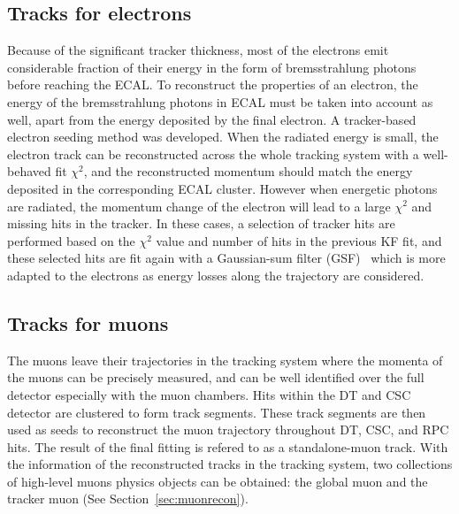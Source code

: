 \subsection{Tracks for electrons}
Because of the significant tracker thickness, most of the electrons emit considerable fraction of their energy in the form of bremsstrahlung photons before reaching the ECAL. To reconstruct the properties of an electron, the energy of the bremsstrahlung photons in ECAL must be taken into account as well, apart from the energy deposited by the final electron. A tracker-based electron seeding method was developed. When the radiated energy is small, the electron track can be reconstructed across the whole tracking system with a well-behaved fit $\chi^2$, and the reconstructed momentum should match the energy deposited in the corresponding ECAL cluster. However when energetic photons are radiated, the momentum change of the electron will lead to a large $\chi^2$ and missing hits in the tracker. In these cases, a selection of tracker hits are performed based on the $\chi^2$ value and number of hits in the previous KF fit, and these selected hits are fit again with a Gaussian-sum filter (GSF)~\cite{ob_electronconst} which is more adapted to the electrons as energy losses along the trajectory are considered. 

\subsection{Tracks for muons}
The muons leave their trajectories in the tracking system where the momenta of the muons can be precisely measured, and can be well identified over the full detector especially with the muon chambers. Hits within the DT and CSC detector are clustered to form track segments. These track segments are then used as seeds to reconstruct the muon trajectory throughout DT, CSC, and RPC hits. The result of the final fitting is refered to as a standalone-muon track. With the information of the reconstructed tracks in the tracking system, two collections of high-level muons physics objects can be obtained: the global muon and the tracker muon (See Section~\ref{sec:muonrecon}).

